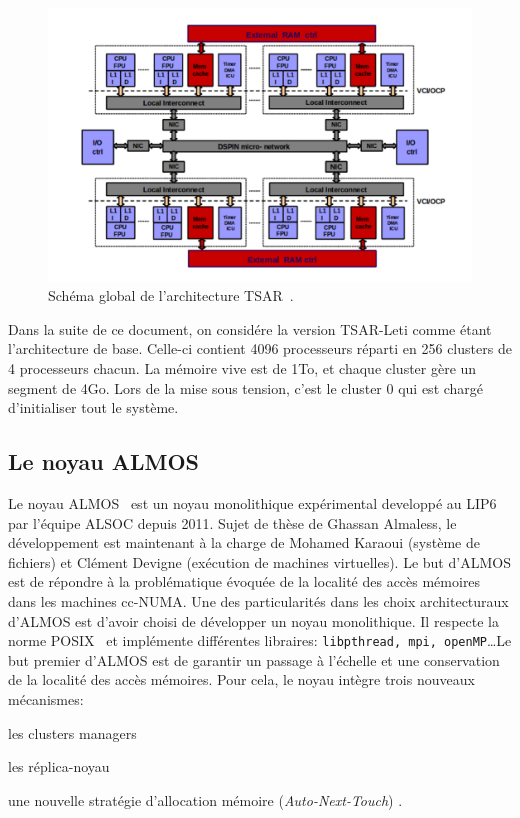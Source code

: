       \begin{figure}[ht]
        \centering \includegraphics[scale=0.2]{include/img/tsar.png}
        \caption{Schéma global de l'architecture TSAR~\citep{greiner2009tsar}.}
        \label{fig:tsar}
      \end{figure}

      Dans la suite de ce document, on considére la version TSAR-Leti comme
      étant l'architecture de base. Celle-ci contient 4096 processeurs réparti
      en 256 clusters de 4 processeurs chacun. La mémoire vive est de 1To, et
      chaque cluster gère un segment de 4Go. Lors de la mise sous tension, c'est
      le cluster 0 qui est chargé d'initialiser tout le système.

    \subsection{Le noyau ALMOS}
    \label{sec:almos}

      Le noyau ALMOS~\cite{almaless2011almos} est un noyau monolithique
      expérimental developpé au LIP6 par l'équipe ALSOC depuis 2011. Sujet de
      thèse de Ghassan Almaless, le développement est maintenant à la charge de
      Mohamed Karaoui (système de fichiers) et Clément Devigne (exécution de
      machines virtuelles). Le but d'ALMOS est de répondre à la problématique
      évoquée de la localité des accès mémoires dans les machines cc-NUMA. Une
      des particularités dans les choix architecturaux d'ALMOS est d'avoir
      choisi de développer un noyau monolithique. Il respecte la norme
      POSIX~\cite{posix2013} et implémente différentes libraires:
      \texttt{libpthread, mpi, openMP}\ldots Le but premier d'ALMOS est de
      garantir un passage à l'échelle et une conservation de la localité des
      accès mémoires. Pour cela, le noyau intègre trois nouveaux mécanismes:
      \benumline \item les clusters managers \item les réplica-noyau \item une
      nouvelle stratégie d'allocation mémoire (\textit{Auto-Next-Touch})
      \eenumline.


